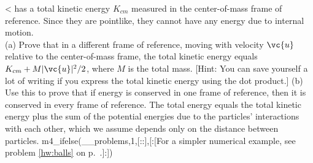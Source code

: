 <%
has a total kinetic energy $K_{cm}$ measured in the
center-of-mass frame of reference. Since they are pointlike,
they cannot have any energy due to internal motion.\\
(a) Prove that in a different frame of reference, moving with
velocity $\vc{u}$ relative to the center-of-mass frame, the total
kinetic energy equals $K_{cm}+M|\vc{u}|^2/2$, where $M$ is the
total mass. [Hint: You can save yourself a lot of writing if
you express the total kinetic energy using the dot product.]\hwendpart
(b) Use this to prove that if energy is conserved in one
frame of reference, then it is conserved in every frame of
reference. The total energy equals the total kinetic energy
plus the sum of the potential energies due to the particles'
interactions with each other, which we assume depends only
on the distance between particles.
m4_ifelse(__problems,1,[::],[:[For a simpler numerical
example, see problem \ref{hw:balls} on p.~\pageref{hw:balls}.]:])
